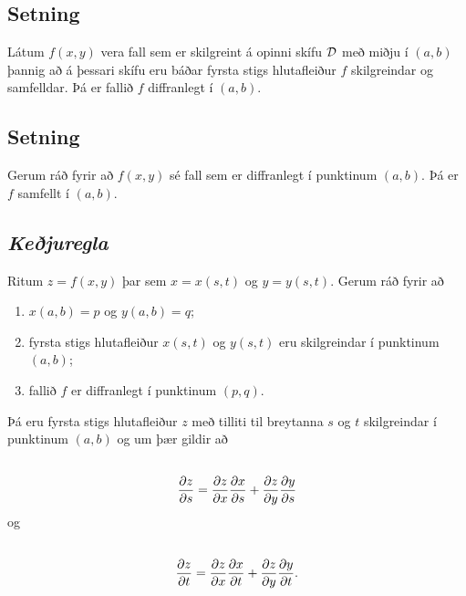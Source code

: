 \documentclass[a4paper,10pt,icelandic]{sphinxmanual}
\begin{document}
\subsection{Setning}
\label{Kafli2:id34}
Látum \(f(x,y)\) vera fall sem er skilgreint á opinni skífu
\(\cal D\) með miðju í \((a,b)\) þannig að á þessari skífu eru
báðar fyrsta stigs hlutafleiður \(f\) skilgreindar og samfelldar. Þá
er fallið \(f\) diffranlegt í \((a,b)\).


\subsection{Setning}
\label{Kafli2:id35}
Gerum ráð fyrir að \(f(x,y)\) sé fall sem er diffranlegt í punktinum
\((a,b)\). Þá er \(f\) samfellt í \((a,b)\).


\subsection{\textit{Keðjuregla}}
\label{Kafli2:id36}
Ritum \(z=f(x,y)\) þar sem \(x=x(s,t)\) og \(y=y(s,t)\).
Gerum ráð fyrir að
\begin{enumerate}
\item {} 
\(x(a,b)=p\) og \(y(a,b)=q\);

\item {} 
fyrsta stigs hlutafleiður \(x(s,t)\) og \(y(s,t)\) eru
skilgreindar í punktinum \((a,b)\);

\item {} 
fallið \(f\) er diffranlegt í punktinum \((p,q)\).

\end{enumerate}

Þá eru fyrsta stigs hlutafleiður \(z\) með tilliti til breytanna
\(s\) og \(t\) skilgreindar í punktinum \((a,b)\) og um þær
gildir að
\begin{gather}
\begin{split}\displaystyle\end{split}\notag\\\begin{split}\frac{\partial z}{\partial s}=
\frac{\partial z}{\partial x}\frac{\partial x}{\partial s}
+\frac{\partial z}{\partial y}\frac{\partial y}{\partial s}\end{split}\notag
\end{gather}
og
\begin{gather}
\begin{split}\displaystyle\end{split}\notag\\\begin{split}\frac{\partial z}{\partial t}=
\frac{\partial z}{\partial x}\frac{\partial x}{\partial t}
+\frac{\partial z}{\partial y}\frac{\partial y}{\partial t}.\end{split}\notag
\end{gather}
\end{document}
